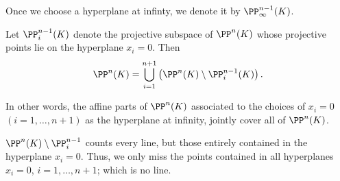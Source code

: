 

Once we choose a hyperplane at infinty, we denote it by $\PP_\infty^{n-1}(K)$.

\begin{lem}
	Let $\PP^{n-1}_i(K)$ denote the projective subspace of $\PP^n(K)$ whose projective points lie on the hyperplane  $x_i = 0$. Then \[
		\PP^n(K) = \bigcup_{i=1}^{n+1} \left(\PP^n(K) \setminus \PP^{n-1}_i(K)\right).
	\]

	In other words, the affine parts of $\PP^n(K)$ associated to the choices of $x_i = 0$ $(i = 1, \dots, n+1)$ as the hyperplane at infinity, jointly cover all of $\PP^n(K)$.
\end{lem}

\begin{dem}
	$\PP^n(K) \setminus \PP^{n-1}_i$ counts every line, but those entirely contained in the hyperplane $x_i = 0$.
	Thus, we only miss the points contained in all hyperplanes $x_i = 0$,  $i = 1, \dots, n+1$; which is no line.
\end{dem}

